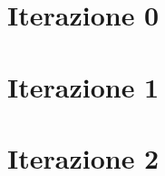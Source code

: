 \documentclass[12pt,a4paper,openright,titlepage,twoside]{book}
\begin{document}
	
	\frontmatter	
	
%	
	\mainmatter				
	\tableofcontents	%
	\listoffigures		%
	\lstlistoflistings  %
	\chapter{Iterazione 0}
	
	
	
	
	
	\chapter{Iterazione 1}
	
	
	
	
    
    
    
    \chapter{Iterazione 2}
	
    \nocite{*}
    \printbibliography
	\backmatter	
 
\end{document}
